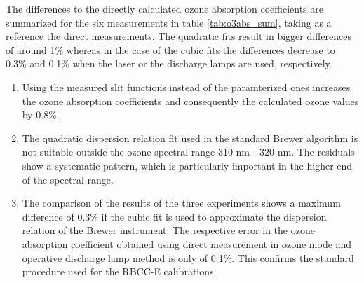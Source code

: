 \documentclass[acp, manuscript]{copernicus}
\begin{document}
The differences to the directly calculated ozone absorption coefficients are summarized for the six measurements in table \ref{tab:o3abs_sum}, taking as a reference the direct measurements. The quadratic fits result in bigger differences of around 1\% whereas in the case of the cubic fits the differences decrease to 0.3\% and  0.1\%  when the laser or the discharge lamps are used, respectively.   




\conclusions{}

\begin{enumerate}


    \item Using the measured slit functions instead of the paramterized ones increases the ozone absorption coefficients and consequently the calculated ozone values by 0.8\%.

    \item The quadratic dispersion relation fit used in the standard Brewer algorithm is not suitable outside the ozone spectral range 310 \unit{nm} - 320 \unit{nm}. The residuals show a systematic pattern, which is particularly important in the higher end of the spectral range.%

    \item The comparison of the results of the three experiments shows a maximum difference of 0.3\% if the cubic fit is used to approximate the dispersion relation of the Brewer instrument. The respective error in the ozone absorption coefficient obtained using direct measurement in ozone mode and operative discharge lamp method is only of 0.1\%. This confirms the standard procedure used for the RBCC-E calibrations.

\end{enumerate}








\end{document}

